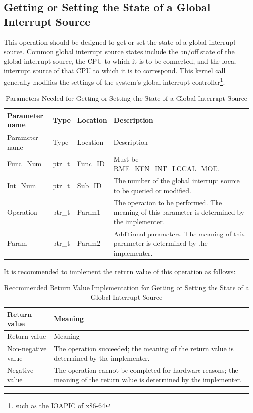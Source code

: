 \subsection{Getting or Setting the State of a Global Interrupt Source}\label{subsec:8-get-or-set-global-interrupt-source-state}

This operation should be designed to get or set the state of a global interrupt source. Common global interrupt source states include the on/off state of the global interrupt source, the CPU to which it is to be connected, and the local interrupt source of that CPU to which it is to correspond. This kernel call generally modifies the settings of the system's global interrupt controller\footnote{such as the IOAPIC of x86-64}.

\begin{xltabular}{\textwidth}{@{}>{\hsize\raggedright\arraybackslash}X>{\hsize\raggedright\arraybackslash}X>{\hsize\raggedright\arraybackslash}X>{\hsize\raggedright\arraybackslash}X@{}}
\caption{Parameters Needed for Getting or Setting the State of a Global Interrupt Source}\label{tab:8-18-get-or-set-global-interrupt-source-state-parameters}\\
\toprule
Parameter name & Type & Location & Description\tabularnewline
\endfirsthead
\toprule
Parameter name & Type & Location & Description\tabularnewline
\midrule
\endhead
\bottomrule
\endlastfoot
Func\_Num & ptr\_t & Func\_ID & Must be RME\_KFN\_INT\_LOCAL\_MOD.\tabularnewline
Int\_Num & ptr\_t & Sub\_ID &
The number of the global interrupt source to be queried or modified.\tabularnewline
Operation & ptr\_t & Param1 &
The operation to be performed. The meaning of this parameter is determined by the implementer.\tabularnewline
Param & ptr\_t & Param2 &
Additional parameters. The meaning of this parameter is determined by the implementer.\tabularnewline
\end{xltabular}
\nopagebreak[4]

It is recommended to implement the return value of this operation as follows:

\begin{xltabular}{\textwidth}{@{}>{\hsize\raggedright\arraybackslash}X>{\hsize\raggedright\arraybackslash}X@{}}
\caption{Recommended Return Value Implementation for Getting or Setting the State of a Global Interrupt Source}\label{tab:8-19-get-or-set-global-interrupt-source-state-suggested-return-values}\\
\toprule
Return value & Meaning\tabularnewline
\endfirsthead
\toprule
Return value & Meaning\tabularnewline
\midrule
\endhead
\bottomrule
\endlastfoot
    Non-negative value & The operation succeeded; the meaning of the return value is determined by the implementer.\tabularnewline
    Negative value & The operation cannot be completed for hardware reasons; the meaning of the return value is determined by the implementer.\tabularnewline
\end{xltabular}
\nopagebreak[4]

